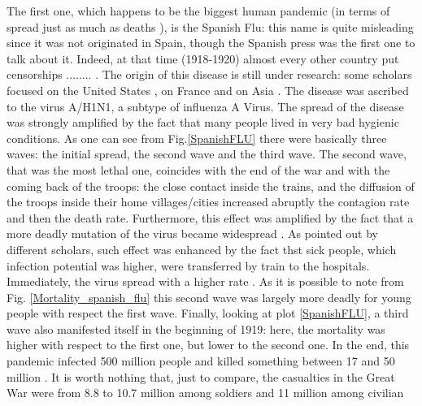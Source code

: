 \documentclass[
12pt, %
a4paper, %
oneside, %
headinclude,footinclude, %
BCOR5mm, %
]{scrartcl}
\begin{document}
 The first one, which happens to be the biggest human pandemic (in terms of spread just as much as deaths \cite{potter2001history} ), is the Spanish Flu: this name is quite misleading since it was not originated in Spain, though the Spanish press was the first one to talk about it. Indeed, at that time (1918-1920) almost every other country put censorships ........ . The origin of this disease is still under research: some scholars focused on the United States \cite{crosby_2003,barry2004site}, on France \cite{shanks2016no} and on Asia \cite{langford2005did}.  The disease was ascribed to the virus A/H1N1, a subtype of influenza A Virus. The spread of the disease was strongly amplified by the fact that many people lived in very bad hygienic conditions. As one can see from Fig.\ref{SpanishFLU} there were basically three waves: the initial spread, the second wave and the third wave. The second wave, that was the most lethal one, coincides with the end of the war and with the coming back of the troops: the close contact inside the trains, and the diffusion of the troops inside their home villages/cities increased abruptly the contagion rate and then the death rate. Furthermore, this effect was amplified by the fact that a more deadly mutation of the virus became widespread \cite{barry2008cross}. As pointed out by different scholars, such effect was enhanced by the fact thst sick people, which infection potential was higher, were transferred by train to the hospitals. Immediately, the virus spread with a higher rate \cite{wever2014death}. As it is possible to note from Fig. \ref{Mortality_spanish_flu} this second wave was largely more deadly for young people with respect the first wave. Finally, looking at plot \ref{SpanishFLU}, a third wave also manifested itself in the beginning of 1919: here, the mortality was higher with respect to the first one, but lower to the second one. In the end, this pandemic infected 500 million people and killed something between 17 and 50 million \cite{spreeuwenberg2018reassessing}. It is worth nothing that, just to compare, the casualties in the Great War were from 8.8 to 10.7 million among soldiers and 11 million among civilian \cite{haythornthwaite1996world}
\end{document}
